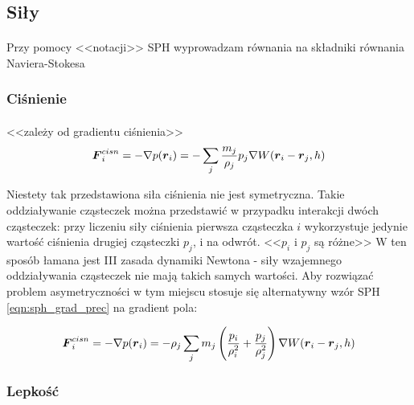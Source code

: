 \subsection{Siły}
\label{subsec:forces_ss}

\paragraph{}
Przy pomocy <<notacji>> SPH wyprowadzam równania na składniki równania Naviera-Stokesa
\par

\subsubsection{Ciśnienie}

\paragraph{}
<<zależy od gradientu ciśnienia>>
\begin{equation}
\boldsymbol{F}_i^{cisn} = -\nabla p(\boldsymbol{r}_i) = - \sum\limits_{j} {m_j \over \rho_j} p_j \nabla W(\boldsymbol{r}_i-\boldsymbol{r}_j, h)
\label{eqn:sph_force_pressure_1}
\end{equation}

Niestety tak przedstawiona siła ciśnienia nie jest symetryczna. Takie oddziaływanie cząsteczek można przedstawić w przypadku interakcji dwóch cząsteczek: przy liczeniu siły ciśnienia pierwsza cząsteczka $i$ wykorzystuje jedynie wartość ciśnienia drugiej cząsteczki $p_j$, i na odwrót. <<$p_i$ i $p_j$ są różne>> W ten sposób łamana jest III zasada dynamiki Newtona - siły wzajemnego oddziaływania cząsteczek nie mają takich samych wartości. Aby rozwiązać problem asymetryczności w tym miejscu stosuje się alternatywny wzór SPH \eqref{eqn:sph_grad_prec} na gradient pola:

\begin{equation}
\boldsymbol{F}_i^{cisn} = -\nabla p(\boldsymbol{r}_i) = - \rho_j \sum\limits_{j} m_j \left( {p_i \over \rho_i^2} + {p_j \over \rho_j^2} \right) \nabla W(\boldsymbol{r}_i-\boldsymbol{r}_j, h)
\label{eqn:sph_force_pressure}
\end{equation}

\par

\subsubsection{Lepkość}

